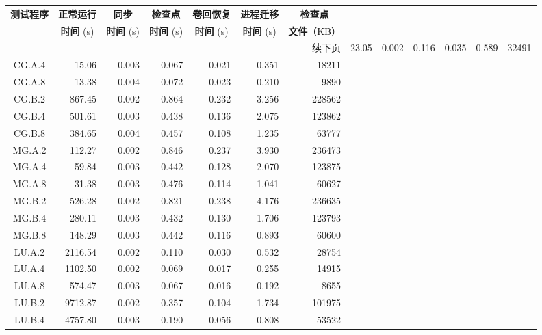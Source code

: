 \begin{ThreePartTable}
\begin{longtable}[c]{c*{6}{r}}
    \toprule
    \textbf{测试程序\tnote{b}} & \multicolumn{1}{c}{\textbf{正常运行}} & \multicolumn{1}{c}{\textbf{同步}}
    & \multicolumn{1}{c}{\textbf{检查点}} & \multicolumn{1}{c}{\textbf{卷回恢复}}
    & \multicolumn{1}{c}{\textbf{进程迁移}} & \multicolumn{1}{c}{\textbf{检查点}} \\
    & \multicolumn{1}{c}{\textbf{时间} (s)} & \multicolumn{1}{c}{\textbf{时间} (s)}
    & \multicolumn{1}{c}{\textbf{时间} (s)} & \multicolumn{1}{c}{\textbf{时间} (s)}
    & \multicolumn{1}{c}{\textbf{时间} (s)} &  \textbf{文件}（KB）\\
    \midrule
    \endhead
    \hline
    \multicolumn{7}{r}{续下页}
    \endfoot
    \insertTableNotes
    \endlastfoot
    CG.C.2 & 23.05   & 0.002 & 0.116          & 0.035 & 0.589 & 32491  \\
    CG.A.4 & 15.06   & 0.003 & 0.067          & 0.021 & 0.351 & 18211  \\
    CG.A.8 & 13.38   & 0.004 & 0.072          & 0.023 & 0.210 & 9890   \\
    CG.B.2 & 867.45  & 0.002 & 0.864          & 0.232 & 3.256 & 228562 \\
    CG.B.4 & 501.61  & 0.003 & 0.438          & 0.136 & 2.075 & 123862 \\
    CG.B.8 & 384.65  & 0.004 & 0.457          & 0.108 & 1.235 & 63777  \\
    MG.A.2 & 112.27  & 0.002 & 0.846\tnote{a} & 0.237 & 3.930 & 236473 \\
    MG.A.4 & 59.84   & 0.003 & 0.442          & 0.128 & 2.070 & 123875 \\
    MG.A.8 & 31.38   & 0.003 & 0.476          & 0.114 & 1.041 & 60627  \\
    MG.B.2 & 526.28  & 0.002 & 0.821          & 0.238 & 4.176 & 236635 \\
    MG.B.4 & 280.11  & 0.003 & 0.432          & 0.130 & 1.706 & 123793 \\
    MG.B.8 & 148.29  & 0.003 & 0.442          & 0.116 & 0.893 & 60600  \\
    LU.A.2 & 2116.54 & 0.002 & 0.110          & 0.030 & 0.532 & 28754  \\
    LU.A.4 & 1102.50 & 0.002 & 0.069          & 0.017 & 0.255 & 14915  \\
    LU.A.8 & 574.47  & 0.003 & 0.067          & 0.016 & 0.192 & 8655   \\
    LU.B.2 & 9712.87 & 0.002 & 0.357          & 0.104 & 1.734 & 101975 \\
    LU.B.4 & 4757.80 & 0.003 & 0.190          & 0.056 & 0.808 & 53522  \\

\end{longtable}
\end{ThreePartTable}
